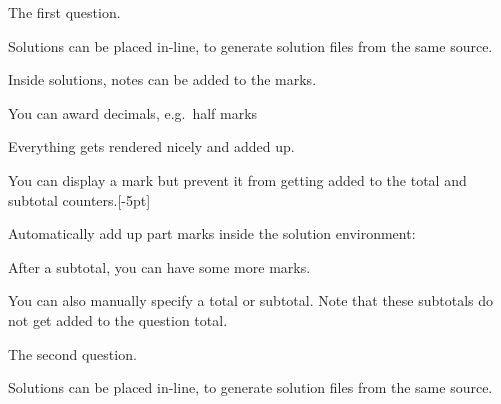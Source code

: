 \documentclass[remote,showsolutions]{ouexam}
\begin{document}
\maketitle


\begin{questionblock}
The first question.	
\end{questionblock}

\begin{solution}
Solutions can be placed in-line, to generate solution files from the same source.

Inside solutions, notes can be added to the marks.

You can award decimals, e.g.\ half marks

Everything gets rendered nicely and added up.

You can display a mark but prevent it from getting added to the total and subtotal counters.[-5pt]

Automatically add up part marks inside the solution environment:
\subtotal*

After a subtotal, you can have some more marks.

You can also manually specify a total or subtotal. Note that these subtotals do not get added to the question total. 

\total*
\end{solution}


\question
\begin{questionblock}
The second question.	
\end{questionblock}

\begin{solution}
Solutions can be placed in-line, to generate solution files from the same source.
\end{solution}
\end{document}

